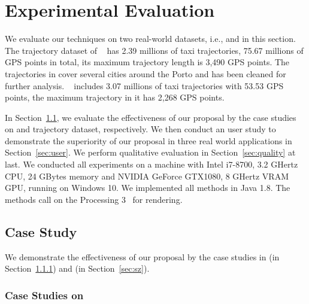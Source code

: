 \section{Experimental Evaluation}\label{sec:exp}
We evaluate our techniques on two real-world datasets, i.e., \pt{} and \sz{} in this section.
The trajectory dataset of \pt{}~\cite{pt} has 2.39 millions of taxi trajectories, 75.67 millions of GPS points in total, its maximum trajectory length is 3,490 GPS points.
The trajectories in \pt{} cover several cities around the Porto and has been cleaned for further analysis.
\sz{}~\cite{sz} includes 3.07 millions of taxi trajectories with 53.53 GPS points, the maximum trajectory in it has 2,268 GPS points.

In Section~\ref{sec:case}, we evaluate the effectiveness of our proposal by the case studies on \pt{} and \sz{} trajectory dataset, respectively.
We then conduct an user study to demonstrate the superiority of our proposal in three real world applications in Section~\ref{sec:user}.
We perform qualitative evaluation in Section~\ref{sec:quality} at last.
We conducted all experiments on a machine with Intel i7-8700, 3.2 GHertz CPU, 24 GBytes memory and NVIDIA GeForce GTX1080, 8 GHertz VRAM GPU, running on Windows 10.
We implemented all methods in Java 1.8. The methods call on the Processing 3~\cite{p3} for rendering.


\subsection{Case Study}\label{sec:case}

We demonstrate the effectiveness of our proposal by the case studies in \pt{} (in Section~\ref{sec:pt}) and \sz{} ({in Section~\ref{sec:sz}}).

\subsubsection{Case Studies on \pt{}}\label{sec:pt}

